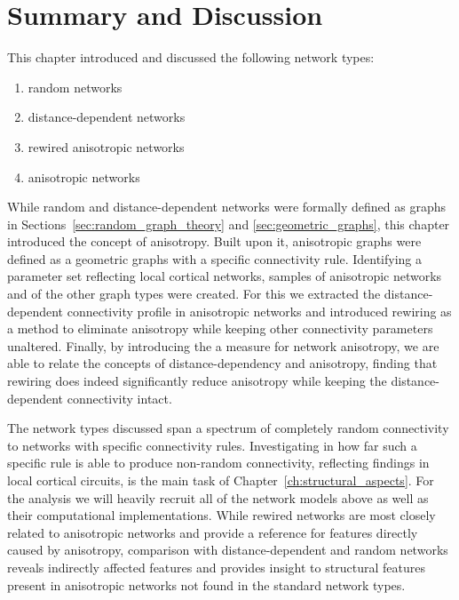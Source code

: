 

\section{Summary and Discussion}

This chapter introduced and discussed the following network types:
\begin{enumerate} 
  \itemsep-11pt
  \item random networks
  \item distance-dependent networks
  \item rewired anisotropic networks
  \item anisotropic networks
\end{enumerate}
While random and distance-dependent networks were formally defined as
graphs in Sections~\ref{sec:random_graph_theory} and
\ref{sec:geometric_graphs}, this chapter introduced the concept of
anisotropy. Built upon it, anisotropic graphs were defined as a
geometric graphs with a specific connectivity rule. Identifying a
parameter set reflecting local cortical networks, samples of
anisotropic networks and of the other graph types were created. For
this we extracted the distance-dependent connectivity profile in
anisotropic networks and introduced rewiring as a method to eliminate
anisotropy while keeping other connectivity parameters unaltered.
Finally, by introducing the a measure for network anisotropy, we are
able to relate the concepts of distance-dependency and anisotropy,
finding that rewiring does indeed significantly reduce anisotropy
while keeping the distance-dependent connectivity intact.

The network types discussed span a spectrum of completely random
connectivity to networks with specific connectivity
rules. Investigating in how far such a specific rule is able to
produce non-random connectivity, reflecting findings in local cortical
circuits, is the main task of Chapter~\ref{ch:structural_aspects}. For
the analysis we will heavily recruit all of the network models above
as well as their computational implementations. While rewired networks
are most closely related to anisotropic networks and provide a
reference for features directly caused by anisotropy, comparison with
distance-dependent and random networks reveals indirectly affected
features and provides insight to structural features present in
anisotropic networks not found in the standard network types.


